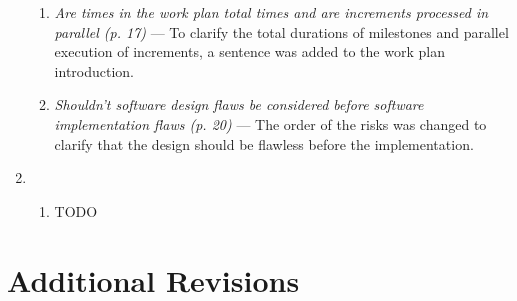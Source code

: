\begin{enumerate}[label=R\arabic*.]
\begin{enumerate}[label=Q\arabic*.]
        \item \textit{Are times in the work plan total times and are increments processed in parallel (p. 17)} --- To clarify the total durations of milestones and parallel execution of increments, a sentence was added to the work plan introduction.
        \item \textit{Shouldn't software design flaws be considered before software implementation flaws (p. 20)} --- The order of the risks was changed to clarify that the design should be flawless before the implementation.
    \end{enumerate}
    \item \begin{enumerate}[label=Q\arabic*.]
        \item TODO
    \end{enumerate}
\end{enumerate}

\section{Additional Revisions}
